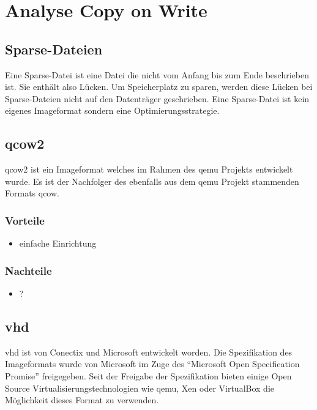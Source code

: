 \chapter{Analyse Copy on Write}
\section{Sparse-Dateien}
Eine Sparse-Datei ist eine Datei die nicht vom Anfang bis zum Ende beschrieben ist. Sie enthält also Lücken. Um Speicherplatz zu sparen, werden diese Lücken bei Sparse-Dateien nicht auf den Datenträger geschrieben. Eine Sparse-Datei ist kein eigenes Imageformat sondern eine Optimierungsstrategie. \cite{sparse}


\section{qcow2}
qcow2 ist ein Imageformat welches im Rahmen des qemu Projekts entwickelt wurde. Es ist der Nachfolger des ebenfalls aus dem qemu Projekt stammenden Formats qcow. \cite{qcowmarkmc} \cite{qemuwiki}

\subsection{Vorteile}
\begin{itemize}
 \item einfache Einrichtung
\end{itemize}

\subsection{Nachteile}
\begin{itemize}
 \item ?
\end{itemize}

\section{vhd}
vhd ist von Conectix und Microsoft entwickelt worden. Die Spezifikation des Imageformats wurde von Microsoft im Zuge des ``Microsoft Open Specification Promise'' freigegeben. Seit der Freigabe der Spezifikation bieten einige Open Source Virtualisierungstechnologien wie qemu, Xen oder VirtualBox die Möglichkeit dieses Format zu verwenden. \cite{msosp} \cite{vhdspec} %

